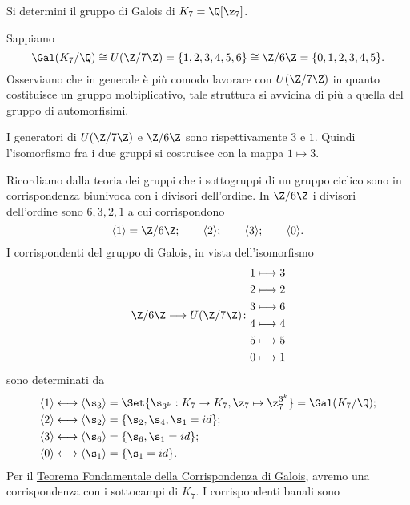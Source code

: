 \begin{exeN}
	Si determini il gruppo di Galois di \(K_7 = \Q[\z_7]\).
\end{exeN}

\begin{sol}
	Sappiamo
	\[
		\Gal(K_7/\Q) \cong U(\Z/7\Z) = \{1,2,3,4,5,6\} \cong \Z/6\Z = \{0,1,2,3,4,5\}.
	\]
	Osserviamo che in generale è più comodo lavorare con \(U(\Z/7\Z)\) in quanto costituisce un gruppo moltiplicativo, tale struttura si avvicina di più a quella del gruppo di automorfisimi.
	
	I generatori di \(U(\Z/7\Z)\) e \(\Z/6\Z\) sono rispettivamente \(3\) e \(1\). Quindi l'isomorfismo fra i due gruppi si costruisce con la mappa \(1 \mapsto 3\).
	
	Ricordiamo dalla teoria dei gruppi che i sottogruppi di un gruppo ciclico sono in corrispondenza biunivoca con i divisori dell'ordine. In \(\Z/6\Z\) i divisori dell'ordine sono \(6,3,2,1\) a cui corrispondono
	\[
		\langle 1 \rangle = \Z/6\Z; \qquad \langle 2 \rangle; \qquad \langle 3 \rangle; \qquad \langle 0 \rangle.
	\]
	I corrispondenti del gruppo di Galois, in vista dell'isomorfismo
	\[
		\Z/6\Z \longrightarrow U(\Z/7\Z)\colon
		\begin{aligned}
			1 & \longmapsto 3  \\
			2 & \longmapsto 2  \\
			3 & \longmapsto 6  \\
			4 & \longmapsto 4  \\
			5 & \longmapsto 5  \\
			0 & \longmapsto 1
		\end{aligned}
	\]
	sono determinati da
	\begin{align*}
		\langle 1 \rangle \longleftrightarrow \langle \s_3 \rangle & = \Set{\s_{3^k} : K_7 \to K_7, \z_7 \mapsto \z_7^{3^k}} = \Gal(K_7/\Q); \\
		\langle 2 \rangle \longleftrightarrow \langle \s_2 \rangle & = \{\s_2,\s_4,\s_1=id\};                                                \\
		\langle 3 \rangle \longleftrightarrow \langle \s_6 \rangle & = \{\s_6,\s_1=id\};                                                     \\
		\langle 0 \rangle \longleftrightarrow \langle \s_1 \rangle & = \{\s_1 = id\}.
	\end{align*}
	Per il \hyperref[th:TFCG]{Teorema Fondamentale della Corrispondenza di Galois}, avremo una corrispondenza con i sottocampi di \(K_7\). I corrispondenti banali sono
	\begin{align*}

\end{align*}
\end{sol}
